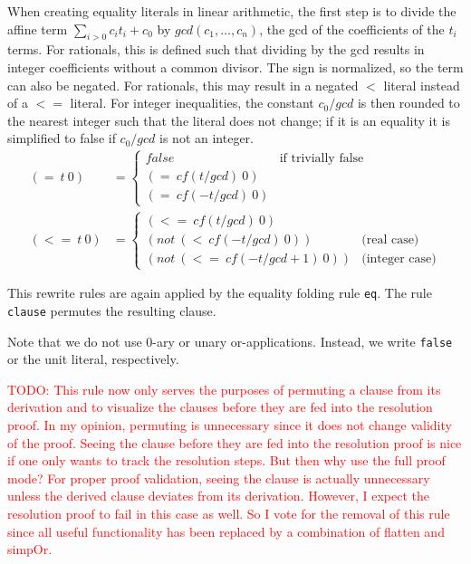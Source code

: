 \documentclass[a4paper]{article}
\newcommand\todo[1]{\textcolor{red}{TODO: #1}}
\newcommand\cf{\mathit{cf}}
\begin{document}
When creating equality literals in linear arithmetic, the first step is
to divide the affine term $\sum_{i>0} c_i t_i + c_0$ by $gcd(c_1,\dots,c_n)$, the
gcd of the coefficients of the $t_i$ terms.  For rationals, this is defined such
that dividing by the gcd results in integer coefficients without a common divisor.
The sign is normalized, so the term can also be negated.  For rationals, this
may result in a negated $<$ literal instead of a $<=$ literal.
For integer inequalities, the constant $c_0/gcd$ is then rounded to the nearest
integer such that the literal does not change; if it is an equality it is simplified
to false if $c_0/gcd$ is not an integer.  
\begin{align}
  (=\ t\ 0) &= \begin{cases} false & \text{if trivially false}\\
    (=\ \cf(t/gcd)\ 0) \\
    (=\ \cf(-t/gcd)\ 0)
  \end{cases}
  \tag{intern}\\
  (<=\ t\ 0) &= \begin{cases} 
    (<=\ \cf(t/gcd)\ 0) \\
    (not\ (<\ \cf(-t/gcd)\ 0)) &\text{(real case)}\\
    (not\ (<=\ \cf(-t/gcd + 1)\ 0))& \text{(integer case)}
  \end{cases}
  \tag{intern}
\end{align}


This rewrite rules are again applied by the equality folding rule \texttt{eq}.
The rule \texttt{clause} permutes the resulting clause.
\begin{mathpar}
\end{mathpar}
Note that we do not use $0$-ary or unary or-applications.  Instead, we write
\texttt{false} or the unit literal, respectively.

\todo{This rule now only serves the purposes of permuting a clause from its
  derivation and to visualize the clauses before they are fed into the
  resolution proof.  In my opinion, permuting is unnecessary since it does not
  change validity of the proof.  Seeing the clause before they are fed into
  the resolution proof is nice if one only wants to track the resolution
  steps.  But then why use the full proof mode?  For proper proof validation,
  seeing the clause is actually unnecessary unless the derived clause deviates
  from its derivation.  However, I expect the resolution proof to fail in this
  case as well.  So I vote for the removal of this rule since all useful
  functionality has been replaced by a combination of flatten and simpOr.}
\end{document}
